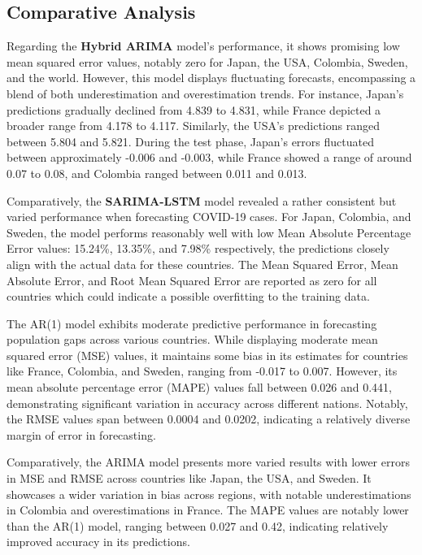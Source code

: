 \documentclass[hidelinks,11pts]{article}
\DeclareMathOperator{\1}{\mathbbm{1}}
\begin{document}
\subsection{Comparative Analysis}



Regarding the \textbf{Hybrid ARIMA} model's performance, it shows promising low mean squared error values, notably zero for Japan, the USA, Colombia, Sweden, and the world. However, this model displays fluctuating forecasts, encompassing a blend of both underestimation and overestimation trends. For instance, Japan's predictions gradually declined from 4.839 to 4.831, while France depicted a broader range from 4.178 to 4.117. Similarly, the USA's predictions ranged between 5.804 and 5.821. During the test phase, Japan's errors fluctuated between approximately -0.006 and -0.003, while France showed a range of around 0.07 to 0.08, and Colombia ranged between 0.011 and 0.013.





Comparatively, the \textbf{SARIMA-LSTM} model revealed a rather consistent but varied performance when forecasting COVID-19 cases. For Japan, Colombia, and Sweden, the model performs reasonably well with low Mean Absolute Percentage Error values: 15.24\%, 13.35\%, and 7.98\% respectively, the predictions closely align with the actual data for these countries. The Mean Squared Error, Mean Absolute Error, and Root Mean Squared Error are reported as zero for all countries which could indicate a possible overfitting to the training data.

The AR(1) model exhibits moderate predictive performance in forecasting population gaps across various countries. While displaying moderate mean squared error (MSE) values, it maintains some bias in its estimates for countries like France, Colombia, and Sweden, ranging from -0.017 to 0.007. However, its mean absolute percentage error (MAPE) values fall between 0.026 and 0.441, demonstrating significant variation in accuracy across different nations. Notably, the RMSE values span between 0.0004 and 0.0202, indicating a relatively diverse margin of error in forecasting.

Comparatively, the ARIMA model presents more varied results with lower errors in MSE and RMSE across countries like Japan, the USA, and Sweden. It showcases a wider variation in bias across regions, with notable underestimations in Colombia and overestimations in France. The MAPE values are notably lower than the AR(1) model, ranging between 0.027 and 0.42, indicating relatively improved accuracy in its predictions.
\end{document}
